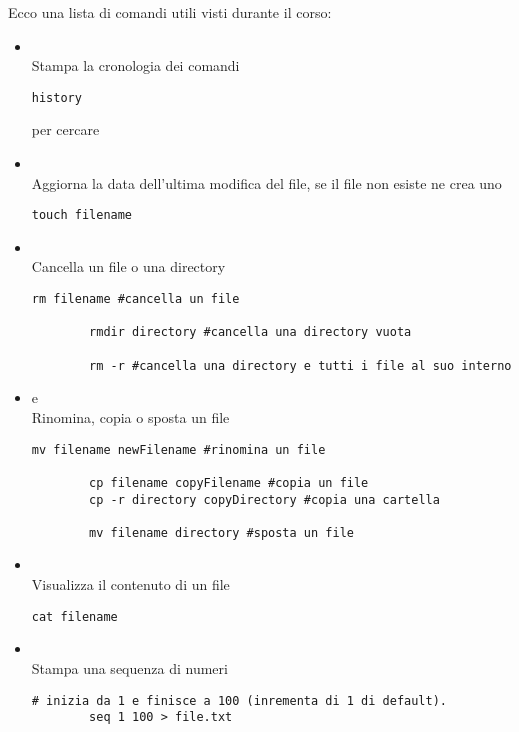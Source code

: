 \documentclass[../main.tex]{subfiles}
\begin{document}
Ecco una lista di comandi utili visti durante il corso:
\begin{itemize}
    \item {} \\
    Stampa la cronologia dei comandi
    \begin{lstlisting}[style=bash]
        history
    \end{lstlisting}
     per cercare
    \item {} \\
    Aggiorna la data dell'ultima modifica del file, se il file non esiste ne crea uno
    \begin{lstlisting}[style=bash]
        touch filename
    \end{lstlisting}
    \item {} \\
    Cancella un file o una directory
    \begin{lstlisting}[style=bash]
        rm filename #cancella un file

        rmdir directory #cancella una directory vuota

        rm -r #cancella una directory e tutti i file al suo interno
    \end{lstlisting}
    \item {} e  \\
    Rinomina, copia o sposta un file
    \begin{lstlisting}[style=bash]
        mv filename newFilename #rinomina un file

        cp filename copyFilename #copia un file
        cp -r directory copyDirectory #copia una cartella

        mv filename directory #sposta un file
    \end{lstlisting}
    \item {} \\
    Visualizza il contenuto di un file
    \begin{lstlisting}[style=bash]
        cat filename
    \end{lstlisting}
    \item {} \\
    Stampa una sequenza di numeri
    \begin{lstlisting}[style=bash]
        # inizia da 1 e finisce a 100 (inrementa di 1 di default).
        seq 1 100 > file.txt


\end{lstlisting}
\end{itemize}
\end{document}
